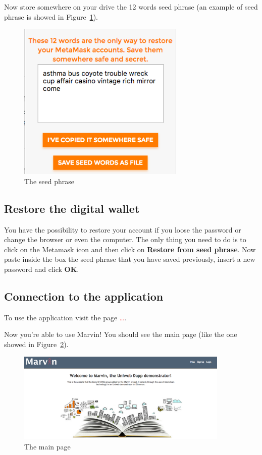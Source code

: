 Now store somewhere on your drive the 12 words seed phrase (an example of seed phrase is showed in Figure~\ref{fig:seed}).
\begin{figure}[!h]
	\centering
	\includegraphics[height=3in]{img/seed.png}
	\caption{The seed phrase}
	\label{fig:seed}
\end{figure}


\subsection{Restore the digital wallet}
You have the possibility to restore your account if you loose the password or change the browser or even the computer. The only thing you need to do is to click on the Metamask icon and then click on \textbf{Restore from seed phrase}. Now paste inside the box the seed phrase that you have saved previously, insert a new password and click \textbf{OK}.

\subsection{Connection to the application}
\WarningSubsection{}

To use the application visit the page \textcolor{red}{	\dots}.

Now you're able to use Marvin! You should see the \project{} main page (like the one showed in Figure~\ref{fig:main}).
\begin{figure}[H]
	\centering
	\includegraphics[width=0.9\textwidth]{img/main.png}
	\caption{The \project{} main page}
	\label{fig:main}
\end{figure}

